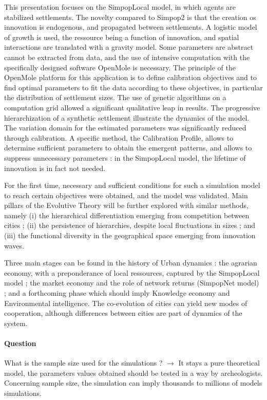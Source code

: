 \documentclass[10pt]{article}
\begin{document}
This presentation focuses on the SimpopLocal model, in which agents are stabilized settlements. The novelty compared to Simpop2 is that the creation os innovation is endogenous, and propagated between settlements. A logistic model of growth is used, the ressource being a function of innovation, and spatial interactions are translated with a gravity model. Some parameters are abstract cannot be extracted from data, and the use of intensive computation with the specifically designed software OpenMole is necessary. The principle of the OpenMole platform for this application is to define calibration objectives and to find optimal parameters to fit the data according to these objectives, in particular the distribution of settlement sizes. The use of genetic algorithms on a computation grid allowed a significant qualitative leap in results. The progressive hierarchization of a synthetic settlement illustrate the dynamics of the model. The variation domain for the estimated parameters was significantly reduced through calibration. A specific method, the Calibration Profile, allows to determine sufficient parameters to obtain the emergent patterns, and allows to suppress unnecessary parameters : in the SimpopLocal model, the lifetime of innovation is in fact not needed.

For the first time, necessary and sufficient conditions for such a simulation model to reach certain objectives were obtained, and the model was validated. Main pillars of the Evolutive Theory will be further explored with similar methods, namely (i) the hierarchical differentiation emerging from competition between cities ; (ii) the persistence of hierarchies, despite local fluctuations in sizes ; and (iii) the functional diversity in the geographical space emerging from innovation waves.

Three main stages can be found in the history of Urban dynamics : the agrarian economy, with a preponderance of local ressources, captured by the SimpopLocal model ; the market economy and the role of network returns (SimpopNet model) ; and a forthcoming phase which should imply Knowledge economy and Environmental intelligence. The co-evolution of cities can yield new modes of cooperation, although differences between cities are part of dynamics of the system.


\paragraph{Question}

What is the sample size used for the simulations ? $\rightarrow$ It stays a pure theoretical model, the parameters values obtained should be tested in a way by archeologists. Concerning sample size, the simulation can imply thousands to millions of models simulations.
\end{document}
